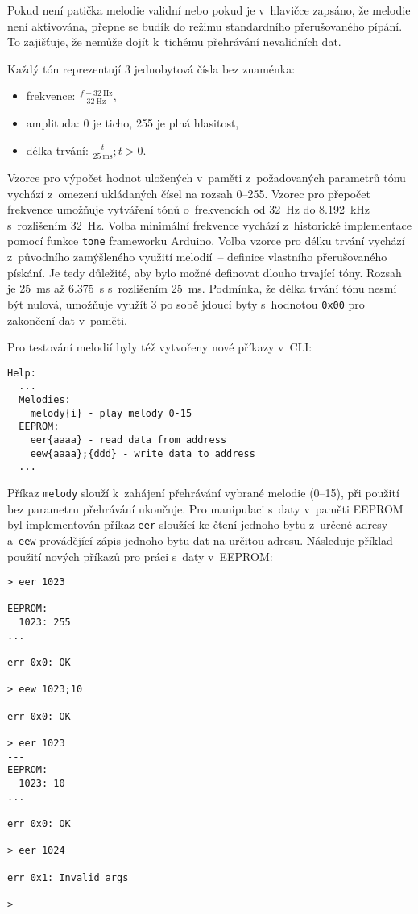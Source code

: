 Pokud není patička melodie validní nebo pokud je v~hlavičce zapsáno, že melodie
není aktivována, přepne se budík do režimu standardního přerušovaného pípání.
To zajišťuje, že nemůže dojít k~tichému přehrávání nevalidních dat.

Každý tón reprezentují 3 jednobytová čísla bez znaménka:
\begin{itemize}[nosep]
    \item frekvence: $\frac{f - \SI{32}{\hertz}}{\SI{32}{\hertz}}$,
    \item amplituda: \num{0} je ticho, \num{255} je plná hlasitost,
    \item délka trvání: $\frac{t}{\SI{25}{\milli\second}}; t > 0$.
\end{itemize}

Vzorce pro výpočet hodnot uložených v~paměti z~požadovaných parametrů tónu
vychází z~omezení ukládaných čísel na rozsah \numrange{0}{255}.
Vzorec pro přepočet frekvence umožňuje vytváření tónů o~frekvencích od
\SI{32}{\hertz} do \SI{8,192}{\kilo\hertz} s~rozlišením \SI{32}{\hertz}.
Volba minimální frekvence vychází z~historické implementace pomocí funkce
\verb|tone| frameworku Arduino. Volba vzorce pro délku trvání vychází
z~původního zamýšleného využití melodií~-- definice vlastního přerušovaného
pískání. Je tedy důležité, aby bylo možné definovat dlouho trvající tóny.
Rozsah je \SI{25}{\milli\second} až \SI{6,375}{\second} s~rozlišením
\SI{25}{\milli\second}. Podmínka, že délka trvání tónu nesmí být nulová,
umožňuje využít 3 po sobě jdoucí byty s~hodnotou \texttt{0x00} pro zakončení
dat v~paměti.

Pro testování melodií byly též vytvořeny nové příkazy v~CLI:
\begin{lstlisting}[style=terminal]
Help:
  ...
  Melodies:
    melody{i} - play melody 0-15
  EEPROM:
    eer{aaaa} - read data from address
    eew{aaaa};{ddd} - write data to address
  ...
\end{lstlisting}

Příkaz \verb|melody| slouží k~zahájení přehrávání vybrané melodie
(\numrange{0}{15}), při použití bez parametru přehrávání ukončuje.
Pro manipulaci s~daty v~paměti EEPROM byl implementován příkaz
\verb|eer| sloužící ke čtení jednoho bytu z~určené adresy a~\verb|eew|
provádějící zápis jednoho bytu dat na určitou adresu. Následuje příklad použití
nových příkazů pro práci s~daty v~EEPROM:
\begin{lstlisting}[style=terminal]
> eer 1023
---
EEPROM:
  1023: 255
...

err 0x0: OK

> eew 1023;10

err 0x0: OK

> eer 1023
---
EEPROM:
  1023: 10
...

err 0x0: OK

> eer 1024

err 0x1: Invalid args

>
\end{lstlisting}

